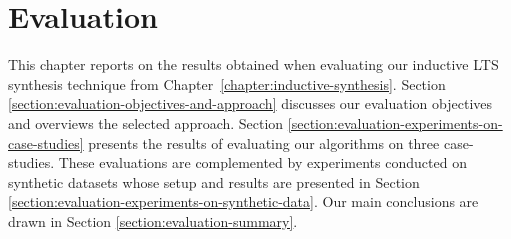 \chapter{Evaluation\label{chapter:evaluation}}

This chapter reports on the results obtained when evaluating our inductive LTS synthesis technique from Chapter~\ref{chapter:inductive-synthesis}. Section \ref{section:evaluation-objectives-and-approach} discusses our evaluation objectives and overviews the selected approach. Section \ref{section:evaluation-experiments-on-case-studies} presents the results of evaluating our algorithms on three case-studies. These evaluations are complemented by experiments conducted on synthetic datasets whose setup and results are presented in Section \ref{section:evaluation-experiments-on-synthetic-data}. Our main conclusions are drawn in Section \ref{section:evaluation-summary}.





